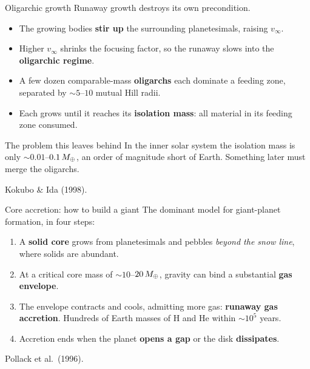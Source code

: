 \documentclass[aspectratio=169, 11pt]{beamer}
\begin{document}
\begin{frame}{Oligarchic growth}
  Runaway growth destroys its own precondition.
  \vskip6pt\relax
  \begin{itemize}
    \item The growing bodies \textbf{stir up} the surrounding planetesimals, raising $v_{\infty}$.
    \item Higher $v_{\infty}$ shrinks the focusing factor, so the runaway slows into the \textbf{oligarchic regime}.
    \item A few dozen comparable-mass \textbf{oligarchs} each dominate a feeding zone, separated by $\sim 5$--$10$ mutual Hill radii.
    \item Each grows until it reaches its \textbf{isolation mass}: all material in its feeding zone consumed.
  \end{itemize}
  \vskip6pt\relax
  \begin{block}{The problem this leaves behind}
    In the inner solar system the isolation mass is only $\sim 0.01$--$0.1\,M_{\oplus}$, an order of magnitude short of Earth. Something later must merge the oligarchs.
  \end{block}
  \vskip2pt\relax
  {\footnotesize Kokubo \& Ida (1998).}
\end{frame}

\begin{frame}{Core accretion: how to build a giant}
  The dominant model for giant-planet formation, in four steps:
  \vskip6pt\relax
  \begin{enumerate}
    \item A \textbf{solid core} grows from planetesimals and pebbles \emph{beyond the snow line}, where solids are abundant.
    \item At a critical core mass of $\sim 10$--$20\,M_{\oplus}$, gravity can bind a substantial \textbf{gas envelope}.
    \item The envelope contracts and cools, admitting more gas: \textbf{runaway gas accretion}. Hundreds of Earth masses of H and He within $\sim 10^5$ years.
    \item Accretion ends when the planet \textbf{opens a gap} or the disk \textbf{dissipates}.
  \end{enumerate}
  \vskip6pt\relax
  \vskip2pt\relax
  {\footnotesize Pollack et al.\ (1996).}
\end{frame}
\end{document}
